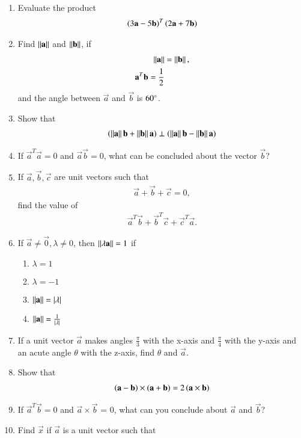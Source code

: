 \begin{enumerate}[label=\arabic*.,ref=\thesubsection.\theenumi]
\item Evaluate the product 
\begin{align}
\left(3\mathbf{a}-5\mathbf{b}\right)^T\left(2\mathbf{a}+7\mathbf{b}\right) 
\end{align}
\item Find $\left\lVert\mathbf{a}\right\rVert$ and $\left\lVert\mathbf{b}\right\rVert$, if
\begin{align}
\left\lVert\mathbf{a}\right\rVert &= \left\lVert\mathbf{b}\right\rVert,
\\
\mathbf{a}^T\mathbf{b} = \frac{1}{2} 
\end{align}
and the angle between $\vec{a}$ and $\vec{b}$ is $60\degree$.
\item Show that 
\begin{align}
\left(\left\lVert\mathbf{a}\right\rVert\mathbf{b}+\left\lVert\mathbf{b}\right\rVert\mathbf{a}\right)\perp \left(\left\lVert\mathbf{a}\right\rVert\mathbf{b}-\left\lVert\mathbf{b}\right\rVert\mathbf{a}\right)
\end{align}
\item If $\vec{a}^T\vec{a}=0$ and  $\vec{a}\vec{b}=0$, what can be concluded about the vector $\vec{b}$?
\item If $\vec{a},\vec{b},\vec{c}$ are unit vectors such that 
\begin{align}
\vec{a}+\vec{b}+\vec{c} = 0,
\end{align}
find the value of 
\begin{align}
\vec{a}^T\vec{b}+\vec{b}^T\vec{c}+\vec{c}^T\vec{a}.
\end{align}
\item If $\vec{a} \ne \vec{0}, \lambda \ne 0$, then $\left\lVert\lambda \mathbf{a}\right\rVert = 1$ if
\begin{enumerate}
\item $\lambda =1$
\item $\lambda = -1$
\item $\left\lVert\mathbf{a}\right\rVert=\left\vert\lambda\right\vert$
\item $\left\lVert\mathbf{a}\right\rVert=\frac{1}{\left\vert\lambda\right\vert}$
\end{enumerate}
\item If a unit vector $\vec{a}$ makes angles $\frac{\pi}{3}$ with the x-axis and $\frac{\pi}{4}$ with the y-axis and an acute angle $\theta$ with the z-axis, find $\theta$ and $\vec{a}$.
\item Show that 
\begin{align}
\left(\mathbf{a}-\mathbf{b}\right)\times \left(\mathbf{a}+\mathbf{b}\right) = 2\left(\mathbf{a}\times\mathbf{b}\right)
\end{align}
\item If $\vec{a}^T\vec{b} = 0$ and $\vec{a}\times \vec{b}$ = 0, what can you conclude about $\vec{a}$ and $\vec{b}$?
\item Find $\vec{x}$ if  $\vec{a}$ is a unit vector such that

\end{enumerate}
